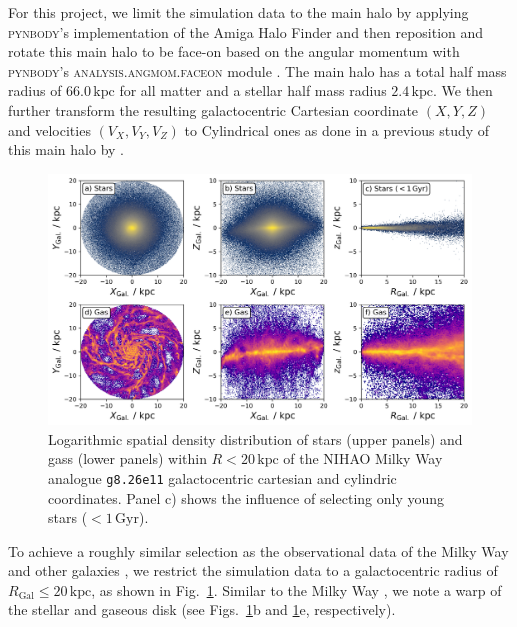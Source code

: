 \documentclass[fleqn,usenatbib]{mnras}
\begin{document}
For this project, we limit the simulation data to the main halo by applying \textsc{pynbody}'s implementation of the Amiga Halo Finder \citep{Knollman2009} and then reposition and rotate this main halo to be face-on based on the angular momentum with \textsc{pynbody}'s \textsc{analysis.angmom.faceon} module \citep{pynbody}. The main halo has a total half mass radius of $66.0\,\mathrm{kpc}$ for all matter and a stellar half mass radius $2.4\,\mathrm{kpc}$. We then further transform the resulting galactocentric Cartesian coordinate $(X,Y,Z)$ and velocities $(V_X,V_Y,V_Z)$ to Cylindrical ones as done in a previous study of this main halo by \citet{Buder2024}.

\begin{figure}
    \centering
    \includegraphics[width=\textwidth]{figures/stars_and_gas_overview.png}
    \caption{Logarithmic spatial density distribution of stars (upper panels) and gass (lower panels) within $R < 20\,\mathrm{kpc}$ of the NIHAO Milky Way analogue \texttt{g8.26e11} galactocentric cartesian and cylindric coordinates. Panel c) shows the influence of selecting only young stars ($<1\,\mathrm{Gyr}$).}
    \label{fig:stars_and_gas_overview}
\end{figure}

To achieve a roughly similar selection as the observational data of the Milky Way \citep{Genovali2014} and other galaxies \citep[e.g.][]{Chen2023}, we restrict the simulation data to a galactocentric radius of $R_\mathrm{Gal} \leq 20\,\mathrm{kpc}$, as shown in Fig.~\ref{fig:stars_and_gas_overview}. Similar to the Milky Way \citep{Poggio2018, Lemasle2022}, we note a warp of the stellar and gaseous disk (see Figs.~\ref{fig:stars_and_gas_overview}b and \ref{fig:stars_and_gas_overview}e, respectively).
\end{document}
